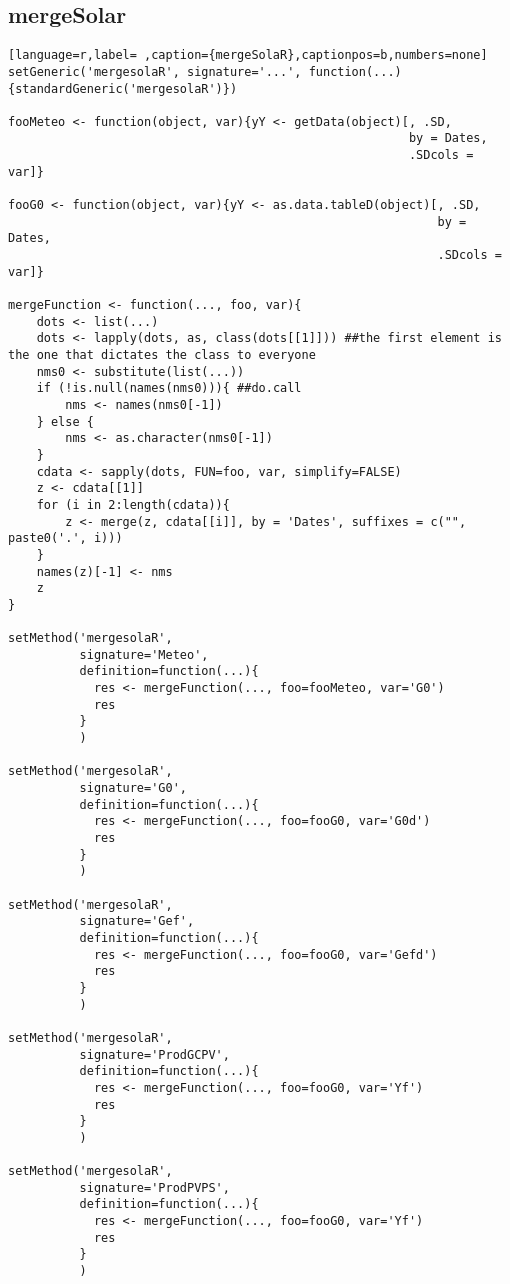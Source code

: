 \subsection{mergeSolar}
\label{sec:org1ebfd09}
\label{subsec:mergesolar}
\begin{lstlisting}[language=r,label= ,caption={mergeSolaR},captionpos=b,numbers=none]
setGeneric('mergesolaR', signature='...', function(...){standardGeneric('mergesolaR')})

fooMeteo <- function(object, var){yY <- getData(object)[, .SD,
                                                        by = Dates,
                                                        .SDcols = var]}

fooG0 <- function(object, var){yY <- as.data.tableD(object)[, .SD,
                                                            by = Dates,
                                                            .SDcols = var]}

mergeFunction <- function(..., foo, var){
    dots <- list(...)
    dots <- lapply(dots, as, class(dots[[1]])) ##the first element is the one that dictates the class to everyone
    nms0 <- substitute(list(...))
    if (!is.null(names(nms0))){ ##do.call
        nms <- names(nms0[-1])
    } else { 
        nms <- as.character(nms0[-1])
    }
    cdata <- sapply(dots, FUN=foo, var, simplify=FALSE)
    z <- cdata[[1]]
    for (i in 2:length(cdata)){
        z <- merge(z, cdata[[i]], by = 'Dates', suffixes = c("", paste0('.', i)))
    }
    names(z)[-1] <- nms
    z
}

setMethod('mergesolaR',
          signature='Meteo',
          definition=function(...){
            res <- mergeFunction(..., foo=fooMeteo, var='G0')
            res
          }
          )

setMethod('mergesolaR',
          signature='G0',
          definition=function(...){
            res <- mergeFunction(..., foo=fooG0, var='G0d')
            res
          }
          )

setMethod('mergesolaR',
          signature='Gef',
          definition=function(...){
            res <- mergeFunction(..., foo=fooG0, var='Gefd')
            res
          }
          )

setMethod('mergesolaR',
          signature='ProdGCPV',
          definition=function(...){
            res <- mergeFunction(..., foo=fooG0, var='Yf')
            res
          }
          )

setMethod('mergesolaR',
          signature='ProdPVPS',
          definition=function(...){
            res <- mergeFunction(..., foo=fooG0, var='Yf')
            res
          }
          )
\end{lstlisting}
